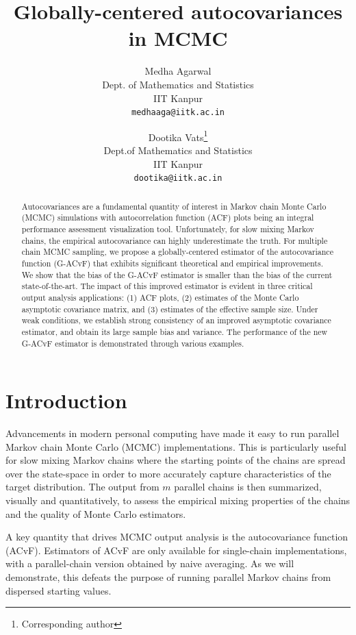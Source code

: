 \documentclass[11pt]{article}
\title{Globally-centered autocovariances in MCMC}
\author{
  Medha Agarwal \\
  Dept. of Mathematics and Statistics\\
  IIT Kanpur\\
  \texttt{medhaaga@iitk.ac.in} \and
 Dootika Vats\footnote{Corresponding author}\\
  Dept.of Mathematics and Statistics\\
  IIT Kanpur\\
  \texttt{dootika@iitk.ac.in}
}
\theoremstyle{remark}
\begin{document}
\maketitle


\onehalfspacing
\begin{abstract}
Autocovariances are a fundamental quantity of interest in Markov chain Monte Carlo (MCMC) simulations with autocorrelation function (ACF) plots being an integral performance assessment visualization tool. Unfortunately, for slow mixing Markov chains, the empirical autocovariance can highly underestimate the truth. For multiple chain MCMC sampling,  we propose a globally-centered estimator of the autocovariance function (G-ACvF) that exhibits significant theoretical and empirical improvements. We show that the bias of the G-ACvF estimator is smaller than the bias of the current state-of-the-art.  The impact of this improved estimator is evident in three critical output analysis applications: (1) ACF plots, (2) estimates of the Monte Carlo asymptotic covariance matrix, and (3) estimates of the effective sample size. Under weak conditions, we establish strong consistency of an improved asymptotic covariance estimator, and obtain its large sample bias and variance.  The performance of the new G-ACvF estimator is demonstrated through various examples.
\end{abstract}


\section{Introduction} \label{sec:intro}

Advancements in modern personal computing have made it easy to run parallel Markov chain Monte Carlo (MCMC) implementations. This is particularly useful for slow mixing Markov chains where the starting points of the chains are spread over the state-space in order to more accurately capture characteristics of the target distribution. The output from $m$ parallel chains is then summarized, visually and quantitatively, to assess the empirical mixing properties of the chains and the quality of Monte Carlo estimators.

A key quantity that drives MCMC output analysis is the autocovariance function (ACvF).
 Estimators of ACvF are only available for single-chain implementations, with a parallel-chain version obtained by naive averaging. As we will demonstrate, this defeats the purpose of running parallel Markov chains from dispersed starting values.
 
\end{document}
